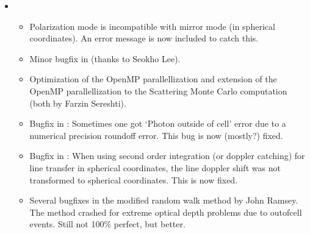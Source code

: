 \documentclass[letterpaper,10pt,english]{sphinxmanual}
\begin{document}
\begin{itemize}
\begin{itemize}
\item {} 
Unformatted image format is from now on C\sphinxhyphen{}style binary instead of
F77\sphinxhyphen{}style unformatted.

\item {} 
The viewimage tool is now ported to Qt by Farzin Sereshti, meaning
that you can now use viewimage without having an IDL license. Viewimage
is a very powerful tool to interactively make and view images of your
model at different wavelengths and viewing angles. It can be found
in the directory .

\item {} 
A Python package for RADMC\sphinxhyphen{}3D was developed by Attila Juhasz. It is
included as of RADMC\sphinxhyphen{}3D version 0.38 in the directory .

\end{itemize}

\item {} 
\begin{itemize}
\item {} 
Polarization mode is incompatible with mirror mode (in spherical
coordinates). An error message is now included to catch this.

\item {} 
Minor bugfix in  (thanks to Seokho Lee).

\item {} 
Optimization of the OpenMP parallellization and extension of the
OpenMP parallellization to the Scattering Monte Carlo computation (both
by Farzin Sereshti).

\item {} 
Bugfix in : Sometimes one got ‘Photon
outside of cell’ error due to a numerical precision round\sphinxhyphen{}off
error. This bug is now (mostly?) fixed.

\item {} 
Bugfix in : When using second order
integration (or doppler catching) for line transfer in spherical
coordinates, the line doppler shift was not transformed to spherical
coordinates. This is now fixed.

\item {} 
Several bugfixes in the modified random walk method by
John Ramsey. The method crashed for extreme optical depth problems
due to out\sphinxhyphen{}of\sphinxhyphen{}cell events. Still not 100\% perfect, but better.


\end{itemize}
\end{itemize}
\end{document}
